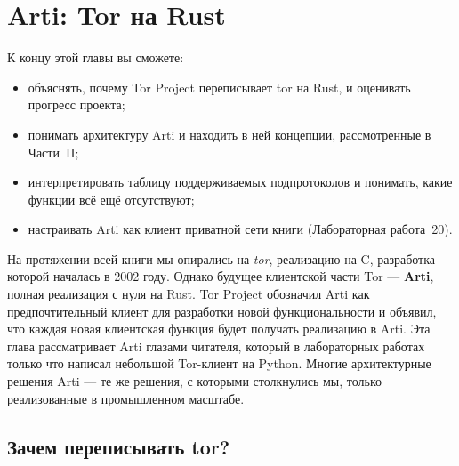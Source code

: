 \chapter{Arti: Tor на Rust}\label{cap:30-arti}

\begin{obiettivi}
К концу этой главы вы сможете:
\begin{itemize}[nosep]
  \item объяснять, почему Tor Project переписывает tor на Rust, и оценивать прогресс проекта;
  \item понимать архитектуру Arti и находить в ней концепции, рассмотренные в Части~II;
  \item интерпретировать таблицу поддерживаемых подпротоколов и понимать, какие функции всё ещё отсутствуют;
  \item настраивать Arti как клиент приватной сети книги (Лабораторная работа~20).
\end{itemize}
\end{obiettivi}

На протяжении всей книги мы опирались на \emph{tor}, реализацию на C, разработка которой началась в 2002 году. Однако будущее клиентской части Tor — \textbf{Arti}, полная реализация с нуля на Rust. Tor Project обозначил Arti как предпочтительный клиент для разработки новой функциональности и объявил, что каждая новая клиентская функция будет получать реализацию в Arti. Эта глава рассматривает Arti глазами читателя, который в лабораторных работах только что написал небольшой Tor-клиент на Python. Многие архитектурные решения Arti — те же решения, с которыми столкнулись мы, только реализованные в промышленном масштабе.

\section{Зачем переписывать tor?}\label{sec:arti-perche}


